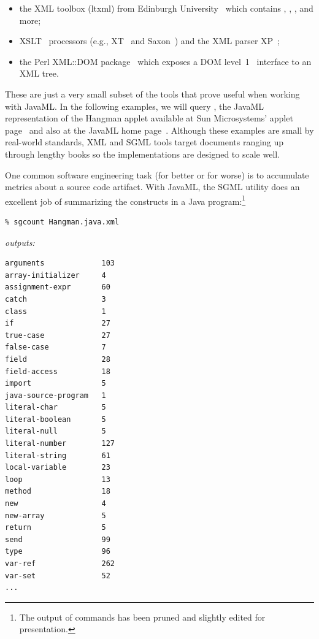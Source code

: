 \documentclass{article}
\begin{document}
\begin{multicols}{2}
\begin{itemize}
\item the XML toolbox (ltxml) from Edinburgh University~\cite{ltxml}
which contains ,
, , and more;

\item XSLT~\cite{XSLT} processors (e.g., XT~\cite{Clark-XT} and Saxon~\cite{Saxon})
      and the XML parser XP~\cite{Clark-XP};

\item the Perl XML::DOM package~\cite{perlDOM} which exposes a
DOM level~1~\cite{DOM} interface to an XML tree.

\end{itemize}

These are just a very small subset of the tools that prove useful when
working with JavaML.  In the following examples, we will query
, the JavaML representation of the Hangman
applet available at Sun Microsystems' applet page~\cite{SunApplets} and
also at the JavaML home page~\cite{Badros-javaml}.  Although these examples
are small by real-world standards, XML and SGML tools target documents
ranging up through lengthy books so the implementations are designed to
scale well.

One common software engineering task (for better or for worse) is to
accumulate metrics about a source code artifact.  With JavaML, the SGML
utility  does an excellent job of summarizing the
constructs in a Java program:\footnote{The output of commands has been
  pruned and slightly edited for presentation.}


{\bfseries
\begin{verbatim}
% sgcount Hangman.java.xml
\end{verbatim}
}
\noindent\emph{outputs:}
{\small
\begin{verbatim}
arguments             103
array-initializer     4
assignment-expr       60
catch                 3
class                 1
if                    27
true-case             27
false-case            7
field                 28
field-access          18
import                5
java-source-program   1
literal-char          5
literal-boolean       5
literal-null          5
literal-number        127
literal-string        61
local-variable        23
loop                  13
method                18
new                   4
new-array             5
return                5
send                  99
type                  96
var-ref               262
var-set               52
...
\end{verbatim}
}


\end{multicols}
\end{document}
